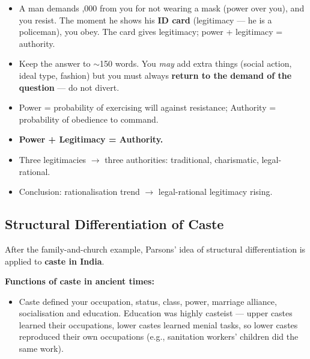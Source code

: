 \begin{ExampleBox}
\begin{itemize}
\item A man demands ,000 from you for not wearing a mask (power over you), and you resist. The moment he shows his \textbf{ID card} (legitimacy --- he is a policeman), you obey. The card gives legitimacy; power + legitimacy = authority.
\end{itemize}
\end{ExampleBox}

\begin{CriticalPoint}
\begin{itemize}
\item Keep the answer to $\sim$150 words. You \textit{may} add extra things (social action, ideal type, fashion) but you must always \textbf{return to the demand of the question} --- do not divert.
\end{itemize}
\end{CriticalPoint}

\begin{QuickRevision}
\begin{itemize}
\item Power = probability of exercising will against resistance; Authority = probability of obedience to command.
\item \textbf{Power + Legitimacy = Authority.}
\item Three legitimacies $\rightarrow$ three authorities: traditional, charismatic, legal-rational.
\item Conclusion: rationalisation trend $\rightarrow$ legal-rational legitimacy rising.
\end{itemize}
\end{QuickRevision}

\sectiondivider

\subsection{Structural Differentiation of Caste}

After the family-and-church example, Parsons' idea of structural differentiation is applied to \textbf{caste in India}.

\begin{DataFact}
\textbf{Functions of caste in ancient times:}
\begin{itemize}
\item Caste defined your occupation, status, class, power, marriage alliance, socialisation and education. Education was highly casteist --- upper castes learned their occupations, lower castes learned menial tasks, so lower castes reproduced their own occupations (e.g., sanitation workers' children did the same work).
\end{itemize}
\end{DataFact}

